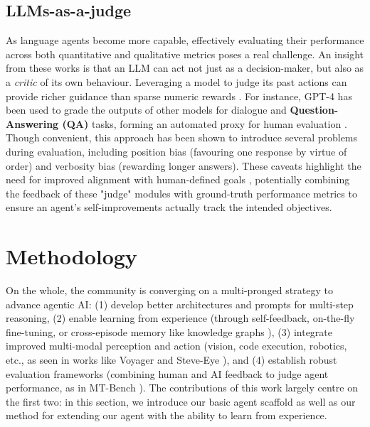 \documentclass[11pt]{article}
\begin{document}
\subsection{LLMs-as-a-judge}
As language agents become more capable, effectively evaluating their performance across both quantitative and qualitative metrics poses a real challenge. An insight from these works is that an LLM can act not just as a decision-maker, but also as a \emph{critic} of its own behaviour. Leveraging a model to judge its past actions can provide richer guidance than sparse numeric rewards \citep{agrawal2025gepa}. For instance, GPT-4 has been used to grade the outputs of other models for dialogue and \textbf{Question-Answering (QA)} tasks, forming an automated proxy for human evaluation \citep{zheng2023mtbench}. Though convenient, this approach has been shown to introduce several problems during evaluation, including position bias (favouring one response by virtue of order) and verbosity bias (rewarding longer answers)\citep{zheng2023mtbench, zhao2024llmjudgefailures}. These caveats highlight the need for improved alignment with human-defined goals \citep{chen2024mllmjudge, zheng2023mtbench}, potentially combining the feedback of these "judge" modules with ground-truth performance metrics to ensure an agent’s self-improvements actually track the intended objectives.

\section{Methodology}


On the whole, the community is converging on a multi-pronged strategy to advance agentic AI: (1) develop better architectures and prompts for multi-step reasoning, (2) enable learning from experience (through self-feedback, on-the-fly fine-tuning, or cross-episode memory like knowledge graphs \citep{anokhin2024arigraph}), (3) integrate improved multi-modal perception and action (vision, code execution, robotics, etc., as seen in works like Voyager \citep{wang2023voyager} and Steve-Eye \citep{zheng2024steveeye}), and (4) establish robust evaluation frameworks (combining human and AI feedback to judge agent performance, as in MT-Bench \citep{zheng2023mtbench}). The contributions of this work largely centre on the first two: in this section, we introduce our basic agent scaffold as well as our method for extending our agent with the ability to learn from experience.
\end{document}

